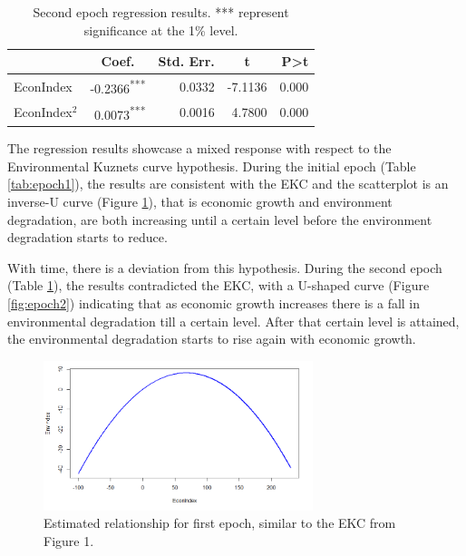 \documentclass[a4paper,12pt]{article}
\begin{document}
\begin{table}[h]
    \centering
    \begin{tabular}{l|rrrr}
    \hline
    \multicolumn{1}{c}{\textbf{}} & \multicolumn{1}{c}{\textbf{Coef.}} & \multicolumn{1}{c}{\textbf{Std. Err.}} & \multicolumn{1}{c}{\textbf{t}} & \textbf{P\textgreater{}t} \\ \hline
    EconIndex                     & -0.2366\textsuperscript{***}                             & 0.0332                                 & -7.1136     & 0.000                     \\ 
    EconIndex$^2$                   & 0.0073\textsuperscript{***}                            & 0.0016                                 & 4.7800    & 0.000                    
    \\ \hline        
\end{tabular}
\caption{Second epoch regression results. *** represent significance at the 1\% level.}
\label{tab:epoch2}
\end{table}

% 

The regression results showcase a mixed response with respect to the Environmental Kuznets curve hypothesis. During the initial epoch (Table \ref{tab:epoch1}), the results are consistent with the EKC and the scatterplot is an inverse-U curve (Figure \ref{fig:epoch1}), that is economic growth and environment degradation, are both increasing until a certain level before the environment degradation starts to reduce.

With time, there is a deviation from this hypothesis. During the second epoch (Table \ref{tab:epoch2}), the results contradicted the EKC, with a U-shaped curve (Figure \ref{fig:epoch2}) indicating that as economic growth increases there is a fall in environmental degradation till a certain level. After that certain level is attained, the environmental degradation starts to rise again with economic growth.


\begin{figure}[h]
    \centering
    \includegraphics[width=0.7\textwidth]{images/kuznets.png}
    \caption{Estimated relationship for first epoch, similar to the EKC from Figure 1.}
    \label{fig:epoch1}
\end{figure}
\end{document}
